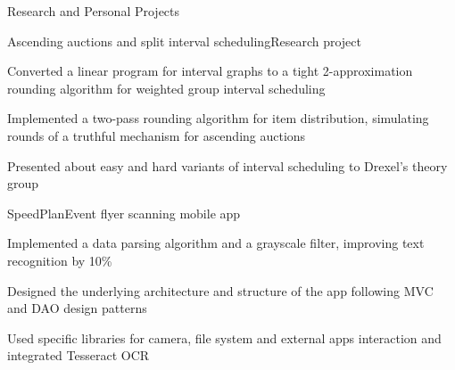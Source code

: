 \documentclass{resume} %
\begin{document}
\begin{rSection}{Research and Personal Projects}

\begin{rSubsection}{Ascending auctions and split interval scheduling}{Research project}{}{}
\item Converted a linear program for interval graphs to a tight 2-approximation rounding algorithm for weighted group interval scheduling
\item Implemented a two-pass rounding algorithm for item distribution, simulating rounds of a truthful mechanism for ascending auctions
\item Presented about easy and hard variants of interval scheduling to Drexel's theory group
\end{rSubsection}

\begin{rSubsection}{SpeedPlan}{Event flyer scanning mobile app}{}{}
\item Implemented a data parsing algorithm and a grayscale filter, improving text recognition by 10\%
\item Designed the underlying architecture and structure of the app following MVC and DAO design patterns
\item Used specific libraries for camera, file system and external apps interaction and integrated Tesseract OCR
\end{rSubsection}

\end{rSection}

\vfill
\hspace{0pt}
\end{document}
